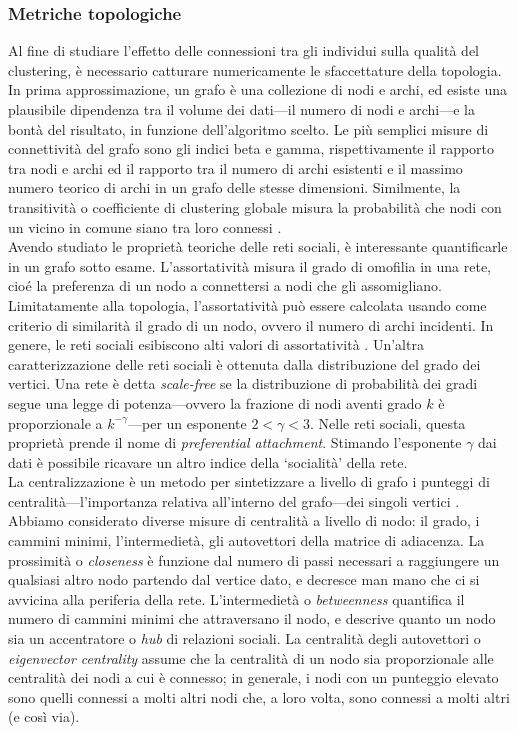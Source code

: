 \subsubsection{Metriche topologiche}
Al fine di studiare l'effetto delle connessioni tra gli individui sulla qualit\`a del clustering, \`e necessario catturare numericamente le sfaccettature della topologia. In prima approssimazione, un grafo \`e una collezione di nodi e archi, ed esiste una plausibile dipendenza tra il volume dei dati---il numero di nodi e archi---e la bont\`a del risultato, in funzione dell'algoritmo scelto.
Le pi\`u semplici misure di connettivit\`a del grafo sono gli indici beta e gamma, rispettivamente il rapporto tra nodi e archi ed il rapporto tra il numero di archi esistenti e il massimo numero teorico di archi in un grafo delle stesse dimensioni. Similmente, la transitivit\`a o coefficiente di clustering globale misura la probabilit\`a che nodi con un vicino in comune siano tra loro connessi \cite{wasserman1994social}.\\
Avendo studiato le propriet\`a teoriche delle reti sociali, \`e interessante quantificarle in un grafo sotto esame. L'assortativit\`a misura il grado di omofilia in una rete, cio\'e la preferenza di un nodo a connettersi a nodi che gli assomigliano. Limitatamente alla topologia, l'assortativit\`a pu\`o essere calcolata usando come criterio di similarit\`a il grado di un nodo, ovvero il numero di archi incidenti. In genere, le reti sociali esibiscono alti valori di assortativit\`a \cite{newman03social,newman02}. Un'altra caratterizzazione delle reti sociali \`e ottenuta dalla distribuzione del grado dei vertici. Una rete \`e detta \textit{scale-free} se la distribuzione di probabilit\`a dei gradi segue una legge di potenza---ovvero la frazione di nodi aventi grado $k$ \`e proporzionale a $k^{-\gamma}$---per un esponente $2<\gamma<3$. Nelle reti sociali, questa propriet\`a prende il nome di \textit{preferential attachment}\cite{Barabasi99emergenceScaling}. Stimando l'esponente $\gamma$ dai dati \`e possibile ricavare un altro indice della `socialit\`a' della rete.\\
La centralizzazione \`e un metodo per sintetizzare a livello di grafo i punteggi di centralit\`a---l'importanza relativa all'interno del grafo---dei singoli vertici \cite{freeman1979centrality,wasserman1994social}. Abbiamo considerato diverse misure di centralit\`a a livello di nodo: il grado, i cammini minimi, l'intermediet\`a, gli autovettori della matrice di adiacenza. La prossimit\`a o \textit{closeness} \`e funzione dal numero di passi necessari a raggiungere un qualsiasi altro nodo partendo dal vertice dato, e decresce man mano che ci si avvicina alla periferia della rete. L'intermediet\`a o \textit{betweenness} quantifica il numero di cammini minimi che attraversano il nodo, e descrive quanto un nodo sia un accentratore o \textit{hub} di relazioni sociali. La centralit\`a degli autovettori o \textit{eigenvector centrality} \cite{bonacich1987power} assume che la centralit\`a di un nodo sia proporzionale alle centralit\`a dei nodi a cui \`e connesso; in generale, i nodi con un punteggio elevato sono quelli connessi a molti altri nodi che, a loro volta, sono connessi a molti altri (e cos\`i via).\\
